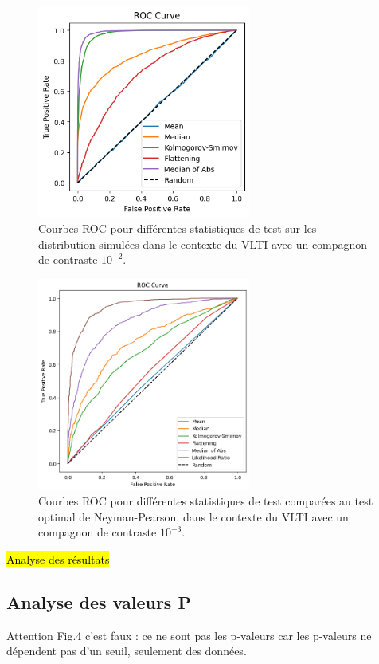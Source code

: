 \documentclass{article}
\newcommand{\dm}[1]{{\color{mulberry} #1}}
\begin{document}
\begin{figure}[H]
\centering
\includegraphics[width=7cm]{img/roc_curves.png}
\caption{Courbes ROC pour différentes statistiques de test sur les distribution simulées dans le contexte du VLTI avec un compagnon de contraste $10^{-2}$.}
\label{fig:roc}
\end{figure}

\begin{figure}[H]
\centering
\includegraphics[width=7cm]{img/neyman_pearson.png}
\caption{Courbes ROC pour différentes statistiques de test comparées au test optimal de Neyman-Pearson, dans le contexte du VLTI avec un compagnon de contraste $10^{-3}$.}
\label{fig:neyman-pearson}
\end{figure}

\hl{Analyse des résultats}

\subsection{Analyse des valeurs P}

\dm{Attention Fig.4 c'est faux : ce ne sont pas les p-valeurs car les p-valeurs ne dépendent pas d'un seuil, seulement des données.}
\end{document}
